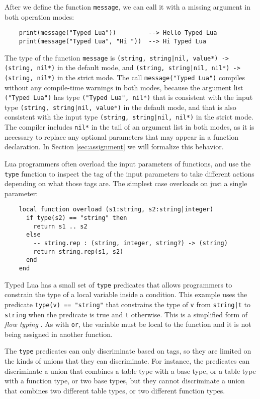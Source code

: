 After we define the function \texttt{message}, we can call it
with a missing argument in both operation modes:
\begin{verbatim}
    print(message("Typed Lua"))         --> Hello Typed Lua
    print(message("Typed Lua", "Hi "))  --> Hi Typed Lua
\end{verbatim}

The type of the function \texttt{message} is
\texttt{(string, string|nil, value*) -> (string, nil*)} in the
default mode, and
\texttt{(string, string|nil, nil*) -> (string, nil*)}
in the strict mode.
The call \texttt{message("Typed Lua")} compiles without
any compile-time warnings in both modes, because the argument list
\texttt{("Typed Lua")} has type \texttt{("Typed Lua", nil*)} that
is consistent with the input type \texttt{(string, string|nil, value*)}
in the default mode, and that is also consistent with the input type
\texttt{(string, string|nil, nil*)} in the strict mode.
The compiler includes \texttt{nil*} in the tail of
an argument list in both modes, as it is necessary
to replace any optional parameters that may appear in
a function declaration.
In Section \ref{sec:assignment} we will formalize this behavior.

Lua programmers often overload the input parameters of functions,
and use the \texttt{type} function to inspect the tag of the
input parameters to take different actions depending on what
those tags are.
The simplest case overloads on just a single parameter:
\begin{verbatim}
    local function overload (s1:string, s2:string|integer)
      if type(s2) == "string" then
        return s1 .. s2
      else
        -- string.rep : (string, integer, string?) -> (string)
        return string.rep(s1, s2)
      end
    end
\end{verbatim}

Typed Lua has a small set of \texttt{type} predicates that allows
programmers to constrain the type of a local variable inside a condition.
This example uses the predicate \texttt{type(v) == "string"} that
constrains the type of \texttt{v} from \texttt{string|t} to
\texttt{string} when the predicate is true and \texttt{t} otherwise.
This is a simplified form of \emph{flow typing} \cite{guha2011tlc,tobin-hochstadt2010ltu}.
As with \texttt{or}, the variable must be local to the function
and it is not being assigned in another function.

The \texttt{type} predicates can only discriminate based on tags,
so they are limited on the kinds of unions that they can discriminate.
For instance, the predicates can discriminate a union that combines
a table type with a base type, or a table type with a function type,
or two base types, but they cannot discriminate a union that combines
two different table types, or two different function types.

